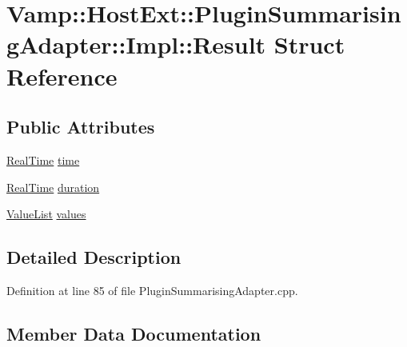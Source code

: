 \hypertarget{struct_vamp_1_1_host_ext_1_1_plugin_summarising_adapter_1_1_impl_1_1_result}{}\section{Vamp\+:\+:Host\+Ext\+:\+:Plugin\+Summarising\+Adapter\+:\+:Impl\+:\+:Result Struct Reference}
\label{struct_vamp_1_1_host_ext_1_1_plugin_summarising_adapter_1_1_impl_1_1_result}
\subsection*{Public Attributes}
\begin{DoxyCompactItemize}
\item 
\hyperlink{struct_vamp_1_1_real_time}{Real\+Time} \hyperlink{struct_vamp_1_1_host_ext_1_1_plugin_summarising_adapter_1_1_impl_1_1_result_a2a4c4f883310ff6947d12a7af9e9d7d7}{time}
\item 
\hyperlink{struct_vamp_1_1_real_time}{Real\+Time} \hyperlink{struct_vamp_1_1_host_ext_1_1_plugin_summarising_adapter_1_1_impl_1_1_result_a9119a867cd226e1a038811dd4ffb176d}{duration}
\item 
\hyperlink{class_vamp_1_1_host_ext_1_1_plugin_summarising_adapter_1_1_impl_a1b882efc9db48427875cb1274478e91d}{Value\+List} \hyperlink{struct_vamp_1_1_host_ext_1_1_plugin_summarising_adapter_1_1_impl_1_1_result_a658a2cffdbc186b2a1c975f5a845c86b}{values}
\end{DoxyCompactItemize}


\subsection{Detailed Description}


Definition at line 85 of file Plugin\+Summarising\+Adapter.\+cpp.



\subsection{Member Data Documentation}
